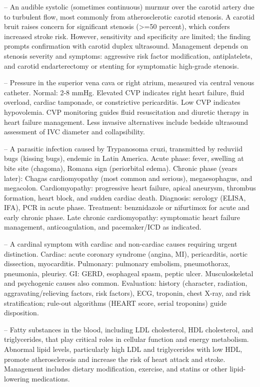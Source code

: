 -- An audible systolic (sometimes continuous) murmur over the carotid artery due to turbulent flow, most commonly from atherosclerotic carotid stenosis. A carotid bruit raises concern for significant stenosis (>=50 percent), which confers increased stroke risk. However, sensitivity and specificity are limited; the finding prompts confirmation with carotid duplex ultrasound. Management depends on stenosis severity and symptoms: aggressive risk factor modification, antiplatelets, and carotid endarterectomy or stenting for symptomatic high-grade stenosis.

-- Pressure in the superior vena cava or right atrium, measured via central venous catheter. Normal: 2-8 mmHg. Elevated CVP indicates right heart failure, fluid overload, cardiac tamponade, or constrictive pericarditis. Low CVP indicates hypovolemia. CVP monitoring guides fluid resuscitation and diuretic therapy in heart failure management. Less invasive alternatives include bedside ultrasound assessment of IVC diameter and collapsibility.

-- A parasitic infection caused by Trypanosoma cruzi, transmitted by reduviid bugs (kissing bugs), endemic in Latin America. Acute phase: fever, swelling at bite site (chagoma), Romana sign (periorbital edema). Chronic phase (years later): Chagas cardiomyopathy (most common and serious), megaesophagus, and megacolon. Cardiomyopathy: progressive heart failure, apical aneurysm, thrombus formation, heart block, and sudden cardiac death. Diagnosis: serology (ELISA, IFA), PCR in acute phase. Treatment: benznidazole or nifurtimox for acute and early chronic phase. Late chronic cardiomyopathy: symptomatic heart failure management, anticoagulation, and pacemaker/ICD as indicated.

-- A cardinal symptom with cardiac and non-cardiac causes requiring urgent distinction. Cardiac: acute coronary syndrome (angina, MI), pericarditis, aortic dissection, myocarditis. Pulmonary: pulmonary embolism, pneumothorax, pneumonia, pleurisy. GI: GERD, esophageal spasm, peptic ulcer. Musculoskeletal and psychogenic causes also common. Evaluation: history (character, radiation, aggravating/relieving factors, risk factors), ECG, troponin, chest X-ray, and risk stratification; rule-out algorithms (HEART score, serial troponins) guide disposition.

-- Fatty substances in the blood, including LDL cholesterol, HDL cholesterol, and triglycerides, that play critical roles in cellular function and energy metabolism. Abnormal lipid levels, particularly high LDL and triglycerides with low HDL, promote atherosclerosis and increase the risk of heart attack and stroke. Management includes dietary modification, exercise, and statins or other lipid-lowering medications.

